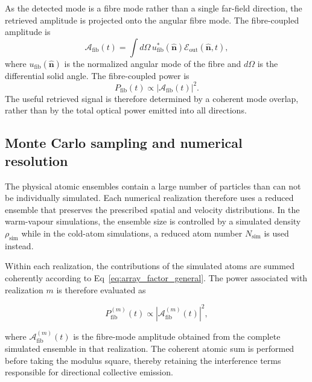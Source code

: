 As the detected mode is a fibre mode rather than a single far-field direction, the retrieved amplitude is projected onto the angular fibre mode. The fibre-coupled amplitude is
\begin{equation}
    \mathcal{A}_{\mathrm{fib}}(t)
    =
    \int d\Omega\,
    u_{\mathrm{fib}}^{*}(\hat{\mathbf n})
    \mathcal{E}_{\mathrm{out}}(\hat{\mathbf n},t),
    \label{eq:fibre_overlap_integral}
\end{equation}
where $u_{\mathrm{fib}}(\hat{\mathbf n})$ is the normalized angular mode of the fibre and $d\Omega$ is the differential solid angle. The fibre-coupled power is
\begin{equation}
    P_{\mathrm{fib}}(t)
    \propto
    \left|
    \mathcal{A}_{\mathrm{fib}}(t)
    \right|^2 .
    \label{eq:fibre_power}
\end{equation}
The useful retrieved signal is therefore determined by a coherent mode overlap, rather than by the total optical power emitted into all directions.

\subsection{Monte Carlo sampling and numerical resolution}
\label{sec:model_monte_carlo}

The physical atomic ensembles contain a large number of particles than can not be individually simulated. Each numerical realization therefore uses a reduced ensemble that preserves the prescribed spatial and velocity distributions. In the warm-vapour simulations, the ensemble size is controlled by a simulated density \(\rho_{\mathrm{sim}}\) while in the cold-atom simulations, a reduced atom number \(N_{\mathrm{sim}}\) is used instead.

Within each realization, the contributions of the simulated atoms are summed coherently according to Eq~\ref{eq:array_factor_general}. The power associated with realization \(m\) is therefore evaluated as

\begin{equation}
    P^{(m)}_{\mathrm{fib}}(t)
    \propto
    \left|
        \mathcal{A}^{(m)}_{\mathrm{fib}}(t)
    \right|^2,
    \label{eq:single_realization_fibre_power}
\end{equation}

where \(\mathcal{A}^{(m)}_{\mathrm{fib}}(t)\) is the fibre-mode amplitude obtained from the complete simulated ensemble in that realization. The coherent atomic sum is performed before taking the modulus square, thereby retaining the interference terms responsible for directional collective emission.

